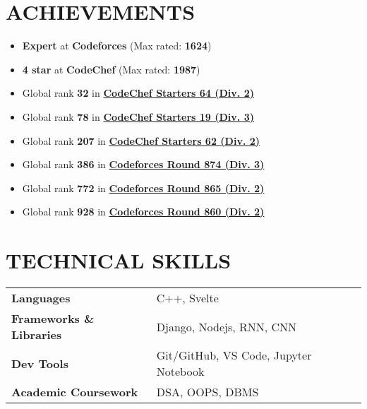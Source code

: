 \documentclass[12pt]{article}
\begin{document}
\section*{ACHIEVEMENTS}
\begin{itemize}[leftmargin=*, topsep=0pt,itemsep=2pt,partopsep=2pt, parsep=2pt]
\item \textbf{Expert} at \textbf{Codeforces} (Max rated: \textbf{1624})
\item \textbf{4 star} at \textbf{CodeChef} (Max rated: \textbf{1987})
\item Global rank \textbf{32} in \href{https://www.codechef.com/rankings/START64B?search=tanishka125}{\textbf{CodeChef Starters 64 (Div. 2)}}
\item Global rank \textbf{78} in \href{https://www.codechef.com/rankings/START19C?search=tanishka125}{\textbf{CodeChef Starters 19 (Div. 3)}}
\item Global rank \textbf{207} in \href{https://www.codechef.com/rankings/START62B?search=tanishka125}{\textbf{CodeChef Starters 62 (Div. 2)}}
\item Global rank \textbf{386} in \href{https://codeforces.com/contest/1833/standings/participant/155663820#p155663820}{\textbf{Codeforces Round 874 (Div. 3)}}
\item Global rank \textbf{772} in \href{https://codeforces.com/contest/1816/standings/participant/153504271#p153504271}{\textbf{Codeforces Round 865 (Div. 2)}}
\item Global rank \textbf{928} in \href{https://codeforces.com/contest/1798/standings/participant/152498821#p152498821}{\textbf{Codeforces Round 860 (Div. 2)}}
\end{itemize}
\begin{table}[h]
\section*{TECHNICAL SKILLS}
\vspace{-2pt}
\centering
\begin{tabularx}{\textwidth}{@{}ll}
\textbf{Languages} & C++, Svelte                                                     \\
\textbf{Frameworks \& Libraries} & Django, Nodejs, RNN, CNN \\
\textbf{Dev Tools} & Git/GitHub, VS Code, Jupyter Notebook                               \\ 
\textbf{Academic Coursework} & DSA, OOPS, DBMS\\
\end{tabularx}
\end{table}
\end{document}
